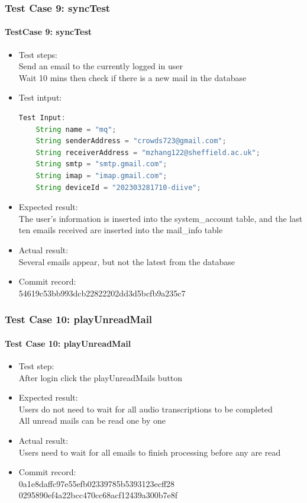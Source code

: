 \documentclass{article}
\begin{document}
\subsubsection{Test Case 9: syncTest}
\paragraph{TestCase 9: syncTest}
\begin{itemize}
\item  Test steps: \\
    Send an email to the currently logged in user \\
    Wait 10 mins  then check if there is a new mail in the database
\item Test intput: \\
    \begin{lstlisting}[language=Java]
    Test Input:
    String name = "mq";
    String senderAddress = "crowds723@gmail.com";
    String receiverAddress = "mzhang122@sheffield.ac.uk";
    String smtp = "smtp.gmail.com";
    String imap = "imap.gmail.com";
    String deviceId = "202303281710-diive";
    \end{lstlisting}
\item Expected result: \\
    The user's information is inserted into the system\_account table, and the last ten emails received are inserted into the mail\_info table
\item Actual result: \\
    Several emails appear, but not the latest from the database
\item Commit record: \\
    54619c53bb993dcb22822202dd3d5bcfb9a235c7
\end{itemize}

\subsubsection{Test Case 10:  playUnreadMail}
\paragraph{Test Case 10:  playUnreadMail}
\begin{itemize}
\item Test step: \\
    After login click the playUnreadMails button
\item Expected result: \\
    Users do not need to wait for all audio transcriptions to be completed \\
    All unread mails can be read one by one
\item Actual result: \\
    Users need to wait for all emails to finish processing before any are read
\item Commit record: \\
    0a1e8daffc97e55efb02339785b5393123ecff28 
    0295890ef4a22bcc470cc68acf12439a300b7e8f
\end{itemize}
\end{document}
